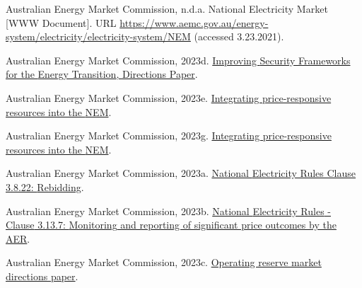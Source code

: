 \documentclass[12pt,a4paper,]{report}
\newlength{\cslhangindent}
\newenvironment{CSLReferences}[2] %
 {%
  \setlength{\parindent}{0pt}
  \ifodd #1 \everypar{\setlength{\hangindent}{\cslhangindent}}\ignorespaces\fi
  \ifnum #2 > 0
  \setlength{\parskip}{#2\baselineskip}
  \fi
 }%
 {}
\begin{document}
\begin{CSLReferences}{1}{0}
\leavevmode{}%
Australian Energy Market Commission, n.d.a. National {Electricity
Market} {[}WWW Document{]}. URL
\url{https://www.aemc.gov.au/energy-system/electricity/electricity-system/NEM}
(accessed 3.23.2021).

\leavevmode{}%
Australian Energy Market Commission, 2023d.
\href{https://www.aemc.gov.au/sites/default/files/2023-08/ERC0290\%20\%E2\%80\%93\%20Improving\%20security\%20frameworks\%20for\%20the\%20energy\%20transition.pdf}{Improving
{Security Frameworks} for the {Energy Transition}, {Directions Paper}}.

\leavevmode{}%
Australian Energy Market Commission, 2023e.
\href{https://www.aemc.gov.au/sites/default/files/2023-08/ERC0352\%20-\%20Integrating\%20price-responsive\%20resources\%20into\%20the\%20NEM\%20-\%20Consultation\%20paper.pdf}{Integrating
price-responsive resources into the {NEM}}.

\leavevmode{}%
Australian Energy Market Commission, 2023g.
\href{https://www.aemc.gov.au/sites/default/files/2023-12/ERC0352\%20-\%20Integrating\%20price-responsive\%20resources\%20into\%20the\%20NEM.pdf}{Integrating
price-responsive resources into the {NEM}}.

\leavevmode{}%
Australian Energy Market Commission, 2023a.
\href{https://energy-rules.aemc.gov.au/ner/477/272296\#3.8.22}{National
{Electricity Rules Clause} 3.8.22: {Rebidding}}.

\leavevmode{}%
Australian Energy Market Commission, 2023b.
\href{https://energy-rules.aemc.gov.au/ner/477/272353\#3.13.7}{National
{Electricity Rules} - {Clause} 3.13.7: {Monitoring} and reporting of
significant price outcomes by the {AER}}.

\leavevmode{}%
Australian Energy Market Commission, 2023c.
\href{https://www.aemc.gov.au/sites/default/files/2023-08/directions_paper_2023_0.pdf}{Operating
reserve market directions paper}.


\end{CSLReferences}
\end{document}
